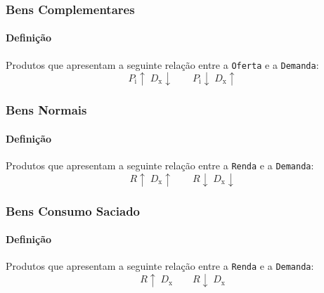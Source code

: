 \documentclass{article}
\begin{document}
        \subsubsection{Bens Complementares}
            \paragraph{Definição}Produtos que apresentam a seguinte relação entre a \texttt{Oferta} e a \texttt{Demanda}:
                \begin{equation}
                    \boxed{
                        P_{\text{i}}\uparrow
                        \;
                        D_{\text{x}}\downarrow
                    }
                    \qquad
                    \boxed{
                        P_{\text{i}}\downarrow
                        \;
                        D_{\text{x}}\uparrow
                    }
                \end{equation}

        \subsubsection{Bens Normais}
            \paragraph{Definição}Produtos que apresentam a seguinte relação entre a \texttt{Renda} e a \texttt{Demanda}:
                \begin{equation}
                    \boxed{
                        R\uparrow
                        \;
                        D_{\text{x}}\uparrow
                    }
                    \qquad
                    \boxed{
                        R\downarrow
                        \;
                        D_{\text{x}}\downarrow
                    }
                \end{equation}

        \subsubsection{Bens Consumo Saciado}
            \paragraph{Definição}Produtos que apresentam a seguinte relação entre a \texttt{Renda} e a \texttt{Demanda}:
                \begin{equation}
                    \boxed{
                        R\uparrow
                        \;
                        D_{\text{x}}
                    }
                    \qquad
                    \boxed{
                        R\downarrow
                        \;
                        D_{\text{x}}
                    }
                \end{equation}
\end{document}
